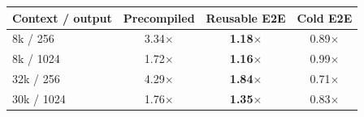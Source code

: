 \begin{tabular}{@{}lccc@{}}
\toprule
Context / output & Precompiled & Reusable E2E & Cold E2E \\
\midrule
8k / 256 & 3.34$\times$ & \textbf{1.18$\times$} & 0.89$\times$ \\
8k / 1024 & 1.72$\times$ & \textbf{1.16$\times$} & 0.99$\times$ \\
32k / 256 & 4.29$\times$ & \textbf{1.84$\times$} & 0.71$\times$ \\
30k / 1024 & 1.76$\times$ & \textbf{1.35$\times$} & 0.83$\times$ \\
\bottomrule
\end{tabular}

